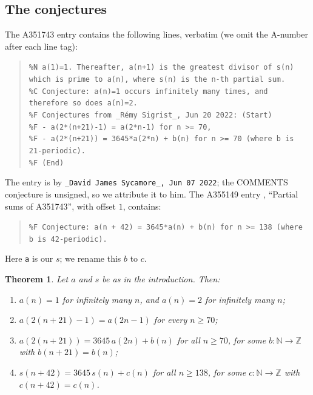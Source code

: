 \documentclass[11pt]{amsart}
\theoremstyle{plain}
\newtheorem{theorem}{Theorem}
\theoremstyle{definition}
\newcommand{\N}{\mathbb{N}}
\newcommand{\Z}{\mathbb{Z}}
\begin{document}
\subsection*{The conjectures}
The A351743 entry \cite{A351743} contains the following lines, verbatim (we omit the A-number after each line tag):
\begin{quote}\raggedright\frenchspacing
{\footnotesize\texttt{\%N a(1)=1. Thereafter, a(n+1) is the greatest divisor of s(n) which is prime to a(n), where s(n) is the n-th partial sum.}\\
\texttt{\%C Conjecture: a(n)=1 occurs infinitely many times, and therefore so does a(n)=2.}\\
\texttt{\%F Conjectures from \_R\'emy Sigrist\_, Jun 20 2022: (Start)}\\
\texttt{\%F - a(2*(n+21)-1) = a(2*n-1) for n >= 70,}\\
\texttt{\%F - a(2*(n+21)) = 3645*a(2*n) + b(n) for n >= 70 (where b is 21-periodic).}\\
\texttt{\%F (End)}}
\end{quote}
The entry is by \texttt{\_David James Sycamore\_, Jun 07 2022}; the COMMENTS conjecture is unsigned, so we attribute it to him. The A355149 entry \cite{A355149}, ``Partial sums of A351743'', with offset $1$, contains:
\begin{quote}\raggedright\frenchspacing
{\footnotesize\texttt{\%F Conjecture: a(n + 42) = 3645*a(n) + b(n) for n >= 138 (where b is 42-periodic).}}
\end{quote}
Here \texttt{a} is our $s$; we rename this $b$ to $c$.

\begin{theorem}\label{thm:main}
Let $a$ and $s$ be as in the introduction. Then:
\begin{enumerate}
\item[(i)] $a(n)=1$ for infinitely many $n$, and $a(n)=2$ for infinitely many $n$;
\item[(ii)] $a(2(n+21)-1)=a(2n-1)$ for every $n\ge70$;
\item[(iii)] $a(2(n+21))=3645\,a(2n)+b(n)$ for all $n\ge70$, for some $b\colon\N\to\Z$ with $b(n+21)=b(n)$;
\item[(iv)] $s(n+42)=3645\,s(n)+c(n)$ for all $n\ge138$, for some $c\colon\N\to\Z$ with $c(n+42)=c(n)$.
\end{enumerate}
\end{theorem}
\end{document}
